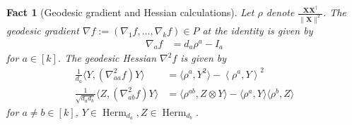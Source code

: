 \documentclass{article}
\newtheorem{fact}[theorem]{Fact}
\renewcommand{\vec}{\bm}
\newcommand\Herm{\operatorname{Herm}}
\begin{document}
\begin{fact}[Geodesic gradient and Hessian calculations]
Let $\rho$ denote $\frac{\vec X \vec X^\dagger}{\|\vec X\|^2}$. The geodesic gradient $\nabla f := (\nabla_1 f, \dots, \nabla_k f) \in P $ at the identity is given by
\begin{align}
\nabla_a f &= d_a \rho^a -  I_{a}
\end{align}
for $a \in [k]$. 
The geodesic Hessian $\nabla^2 f$ is given by 
\begin{align}\frac{1}{d_a}\langle Y, (\nabla^{2}_{aa} f) Y \rangle &= \langle \rho^{a}, Y^{2} \rangle - \left\langle \rho^{a}, Y \right\rangle^{2} \\
\frac{1}{\sqrt{d_a d_b}}\langle Z, (\nabla^{2}_{ab} f) Y \rangle &= \langle \rho^{ab}, Z \otimes Y \rangle  - \langle \rho^{a}, Y \rangle \langle \rho^{b}, Z \rangle
\end{align}
for $a \neq b \in [k]$, $Y \in \Herm_{d_a}, Z \in \Herm_{d_b}$. 
\end{fact}
\end{document}

